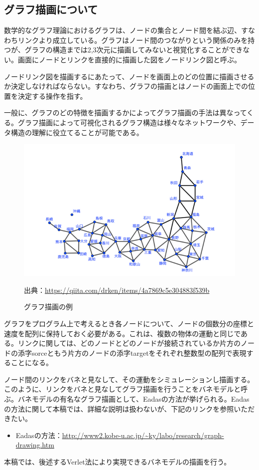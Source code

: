 \documentclass[dvipdfmx]{jsarticle}
\begin{document}
\subsection{グラフ描画について}
数学的なグラフ理論におけるグラフは、ノードの集合とノード間を結ぶ辺、すなわちリンクより成立している。グラフはノード間のつながりという関係のみを持つが、グラフの構造までは2,3次元に描画してみないと視覚化することができない。画面にノードとリンクを直接的に描画した図をノードリンク図と呼ぶ。\par
ノードリンク図を描画するにあたって、ノードを画面上のどの位置に描画させるか決定しなければならない。すなわち、グラフの描画とはノードの画面上での位置を決定する操作を指す。\par
一般に、グラフのどの特徴を描画するかによってグラフ描画の手法は異なってくる。グラフ描画によって可視化されるグラフ構造は様々なネットワークや、データ構造の理解に役立てることが可能である。
\begin{figure}[H]
  \centering
  \includegraphics[scale=0.4]{images/graph_img.png}
  \caption{グラフ描画の例}
  出典：\url{https://qiita.com/drken/items/4a7869c5e304883f539b}
\end{figure}
グラフをプログラム上で考えるとき各ノードについて、ノードの個数分の座標と速度を配列に保持しておく必要がある。これは、複数の物体の運動と同じである。リンクに関しては、どのノードとどのノードが接続されているか片方のノードの添字sorceともう片方のノードの添字targetをそれぞれ整数型の配列で表現することになる。\par
ノード間のリンクをバネと見なして、その運動をシミュレーションし描画する。このように、リンクをバネと見なしてグラフ描画を行うことをバネモデルと呼ぶ。バネモデルの有名なグラフ描画として、Eadasの方法が挙げられる。Eadasの方法に関して本稿では、詳細な説明は扱わないが、下記のリンクを参照いただきたい。
\begin{itemize}
  \item Eadasの方法：\url{http://www2.kobe-u.ac.jp/~ky/labo/research/graph-drawing.htm}
\end{itemize}
本稿では、後述するVerlet法により実現できるバネモデルの描画を行う。\par
\end{document}
